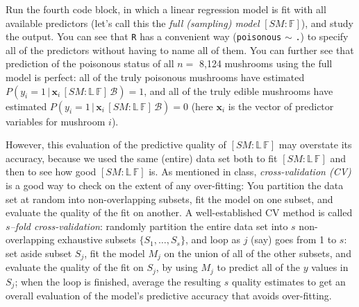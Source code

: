 \documentclass[12pt]{article}
\newcommand{\given}{\, | \,}
\begin{document}
Run the fourth code block, in which a linear regression model is fit with all available predictors (let's call this the \textit{full (sampling) model} $[ SM \! \! : \! \mathbb{ F } ]$), and study the output. You can see that \texttt{R} has a convenient way (\texttt{poisonous} $\sim$ \texttt{.}) to specify all of the predictors without having to name all of them. You can further see that prediction of the poisonous status of all $n =$ 8,124 mushrooms using the full model is perfect: all of the truly poisonous mushrooms have estimated $P ( y_i = 1 \given \bm{ x }_i \, [ SM \! \! : \! \mathbb{ L } \, \mathbb{ F } ] \, \mathcal{ B } ) = 1$, and all of the truly edible mushrooms have estimated $P ( y_i = 1 \given \bm{ x }_i \, [ SM \! \! : \! \mathbb{ L } \, \mathbb{ F } ] \, \mathcal{ B } ) = 0$ (here $\bm{ x }_i$ is the vector of predictor variables for mushroom $i$). 

However, this evaluation of the predictive quality of $[ SM \! \! : \! \mathbb{ L } \, \mathbb{ F } ]$ may overstate its accuracy, because we used the same (entire) data set both to fit $[ SM \! \! : \! \mathbb{ L } \, \mathbb{ F } ]$ and then to see how good $[ SM \! \! : \! \mathbb{ L } \, \mathbb{ F } ]$ is. As mentioned in class, \textit{cross-validation (CV)} is a good way to check on the extent of any over-fitting: You partition the data set at random into non-overlapping subsets, fit the model on one subset, and evaluate the quality of the fit on another. A well-established CV method is called \textit{$s$--fold cross-validation}: randomly partition the entire data set into $s$ non-overlapping exhaustive subsets $\{ S_1, \dots, S_s \}$, and loop as $j$ (say) goes from 1 to $s$: set aside subset $S_j$, fit the model $M_j$ on the union of all of the other subsets, and evaluate the quality of the fit on $S_j$, by using $M_j$ to predict all of the $y$ values in $S_j$; when the loop is finished, average the resulting $s$ quality estimates to get an overall evaluation of the model's predictive accuracy that avoids over-fitting.
\end{document}
